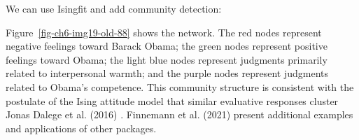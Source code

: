 \documentclass[
  a4paper,
  DIV=11,
  numbers=noendperiod,
  oneside]{scrreprt}
\newenvironment{Shaded}{\begin{snugshade}}{\end{snugshade}}
\newcommand{\AttributeTok}[1]{\textcolor[rgb]{0.40,0.45,0.13}{#1}}
\newcommand{\CommentTok}[1]{\textcolor[rgb]{0.37,0.37,0.37}{#1}}
\newcommand{\ConstantTok}[1]{\textcolor[rgb]{0.56,0.35,0.01}{#1}}
\newcommand{\DecValTok}[1]{\textcolor[rgb]{0.68,0.00,0.00}{#1}}
\newcommand{\FunctionTok}[1]{\textcolor[rgb]{0.28,0.35,0.67}{#1}}
\newcommand{\NormalTok}[1]{\textcolor[rgb]{0.00,0.23,0.31}{#1}}
\newcommand{\OtherTok}[1]{\textcolor[rgb]{0.00,0.23,0.31}{#1}}
\newcommand{\SpecialCharTok}[1]{\textcolor[rgb]{0.37,0.37,0.37}{#1}}
\newcommand{\StringTok}[1]{\textcolor[rgb]{0.13,0.47,0.30}{#1}}
\begin{document}
We can use Isingfit and add community detection:

\begin{Shaded}
\end{Shaded}

Figure~\ref{fig-ch6-img19-old-88} shows the network. The red nodes
represent negative feelings toward Barack Obama; the green nodes
represent positive feelings toward Obama; the light blue nodes represent
judgments primarily related to interpersonal warmth; and the purple
nodes represent judgments related to Obama's competence. This community
structure is consistent with the postulate of the Ising attitude model
that similar evaluative responses cluster Jonas Dalege et al. (2016) .
Finnemann et al. (2021) present additional examples and applications of
other packages.
\end{document}
